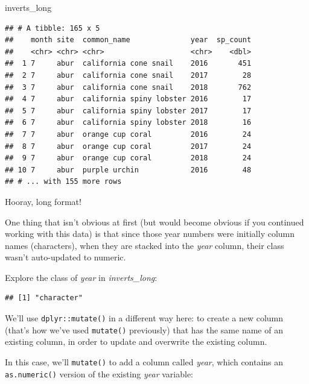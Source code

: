 \documentclass[]{book}
\newenvironment{Shaded}{\begin{snugshade}}{\end{snugshade}}
\newcommand{\KeywordTok}[1]{\textcolor[rgb]{0.13,0.29,0.53}{\textbf{#1}}}
\newcommand{\NormalTok}[1]{#1}
\newcommand{\OperatorTok}[1]{\textcolor[rgb]{0.81,0.36,0.00}{\textbf{#1}}}
\begin{document}
\begin{Shaded}
\begin{Highlighting}[]
\NormalTok{inverts_long}
\end{Highlighting}
\end{Shaded}

\begin{verbatim}
## # A tibble: 165 x 5
##    month site  common_name              year  sp_count
##    <chr> <chr> <chr>                    <chr>    <dbl>
##  1 7     abur  california cone snail    2016       451
##  2 7     abur  california cone snail    2017        28
##  3 7     abur  california cone snail    2018       762
##  4 7     abur  california spiny lobster 2016        17
##  5 7     abur  california spiny lobster 2017        17
##  6 7     abur  california spiny lobster 2018        16
##  7 7     abur  orange cup coral         2016        24
##  8 7     abur  orange cup coral         2017        24
##  9 7     abur  orange cup coral         2018        24
## 10 7     abur  purple urchin            2016        48
## # ... with 155 more rows
\end{verbatim}

Hooray, long format!

One thing that isn't obvious at first (but would become obvious if you continued working with this data) is that since those year numbers were initially column names (characters), when they are stacked into the \emph{year} column, their class wasn't auto-updated to numeric.

Explore the class of \emph{year} in \emph{inverts\_long}:

\begin{Shaded}
\end{Shaded}

\begin{verbatim}
## [1] "character"
\end{verbatim}

We'll use \texttt{dplyr::mutate()} in a different way here: to create a new column (that's how we've used \texttt{mutate()} previously) that has the same name of an existing column, in order to update and overwrite the existing column.

In this case, we'll \texttt{mutate()} to add a column called \emph{year}, which contains an \texttt{as.numeric()} version of the existing \emph{year} variable:
\end{document}
